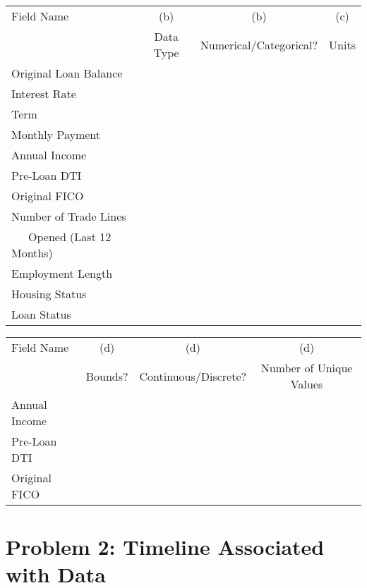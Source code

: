 \documentclass{article}
\begin{document}
\begin{table}
\centering
    \begin{tabular}{l|c|c|c}
        \hline
    Field Name          & (b)        & (b)            &  (c) \\
                        & Data Type  &  Numerical/Categorical?    & Units \\ \hline
    Original Loan Balance & & &  \\ \hline
    Interest Rate  & & &  \\ \hline
    Term         & & & \\  \hline
    Monthly Payment  & & & \\ \hline
    Annual Income & & & \\ \hline
    Pre-Loan DTI  & & & \\ \hline
    Original FICO & & & \\ \hline
    Number of Trade Lines &&& \\
    \ \ \ Opened (Last 12 Months) & & &  \\ \hline
    Employment Length & & &  \\ \hline
    Housing Status & & &  \\ \hline
    Loan Status & & &  \\ \hline
    \end{tabular}
\end{table}


\begin{table}[H]
\centering
    \begin{tabular}{l|c|c|c}
        \hline
    Field Name          & (d)    & (d)  & (d)\\
                       & Bounds? & Continuous/Discrete? & Number of Unique Values \\ \hline
    Annual Income & & & \\ \hline
    Pre-Loan DTI  & & & \\ \hline
    Original FICO & & & \\ \hline
    \end{tabular}
\end{table}


\newpage



\section*{Problem 2: Timeline Associated with Data}
\end{document}
